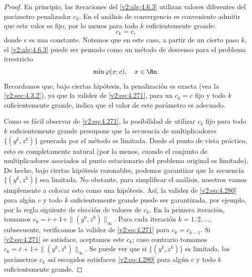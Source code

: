 \begin{proof}
En principio, las iteraciones del \cref{v2:alg:4.6.3} utilizan valores diferentes del parámetro penalizador $c_k$. En el análisis de convergencia es conveniente admitir que este valor es fijo, por lo menos para todo $k$ suficientemente grande:
\begin{equation}
c_k = c,
\label{v2:eq:4.280}
\end{equation}
donde $c$ es una constante. Notemos que en este caso, a partir de un cierto paso $k$, el \cref{v2:alg:4.6.3} puede ser pensado como un método de descenso para el problema irrestricto
\[
\min \varphi(x; c), \quad x \in \Rn.
\]
Recordamos que, bajo ciertas hipótesis, la penalización es exacta (vea la \cref{v2:sec:4.3.2}), ya que la validez de \eqref{v2:eq:4.271}, para un $c_k = c$ fijo y todo $k$ suficientemente grande, indica que el valor de este parámetro es adecuado.

Como es fácil observar de \eqref{v2:eq:4.271}, la posibilidad de utilizar $c_k$ fijo para todo $k$ suficientemente grande presupone que la secuencia de multiplicadores $\{(y^k, z^k)\}$ generada por el método es limitada. Desde el punto de vista práctico, esto es completamente natural (por lo menos, cuando el conjunto de multiplicadores asociados al punto estacionario del problema original es limitado). De hecho, bajo ciertas hipótesis razonables, podemos garantizar que la secuencia $\{(y^k, z^k)\}$ sea limitada. No obstante, para simplificar el análisis, nosotros vamos simplemente a colocar esto como una hipótesis. Así, la validez de \eqref{v2:eq:4.280} para algún $c$ y todo $k$ suficientemente grande puede ser garantizada, por ejemplo, por la regla siguiente de elección de valores de $c_k$. En la primera iteración, tomamos $c_0 = \bar{c} + 1 + \|(y^0, z^0)\|_\infty$. Para cada iteración $k = 1, 2, \dots$, subsecuente, verificamos la validez de \eqref{v2:eq:4.271} para $c_k = c_{k-1}$. Si \eqref{v2:eq:4.271} se satisface, aceptamos este $c_k$; caso contrario tomamos $c_k = \bar{c} + 1 + \|(y^k, z^k)\|_\infty$. Se puede ver que si $\{(y^k, z^k)\}$ es limitada, los parámetros $c_k$ así escogidos satisfacen \eqref{v2:eq:4.280} para algún $c$ y todo $k$ suficientemente grande.


\end{proof}
